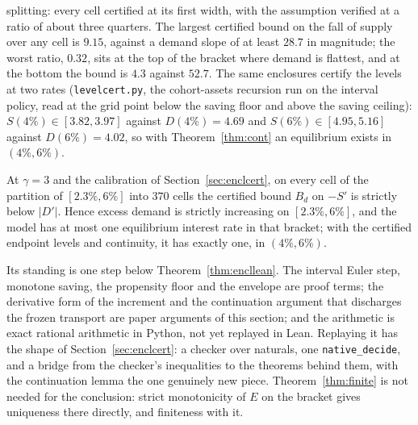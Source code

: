 splitting: every cell certified at its first width, with the assumption verified at a ratio of about
three quarters. The largest certified bound on the fall of supply over any cell is $9.15$, against a
demand slope of at least $28.7$ in magnitude; the worst ratio, $0.32$, sits at the top of the bracket
where demand is flattest, and at the bottom the bound is $4.3$ against $52.7$. The same enclosures
certify the levels at two rates (\texttt{levelcert.py}, the cohort-assets recursion run on the
interval policy, read at the grid point below the saving floor and above the saving ceiling):
$S(4\%)\in[3.82,3.97]$ against $D(4\%)=4.69$ and $S(6\%)\in[4.95,5.16]$ against $D(6\%)=4.02$,
so with Theorem~\ref{thm:cont} an equilibrium exists in $(4\%,6\%)$.

\begin{theorem}\label{thm:bracket}
At $\gamma=3$ and the calibration of Section~\ref{sec:enclcert}, on every cell of the partition of
$[2.3\%,6\%]$ into $370$ cells the certified bound $B_d$ on $-S'$ is strictly below $|D'|$.
Hence excess demand is strictly increasing on $[2.3\%,6\%]$, and the model has at most one
equilibrium interest rate in that bracket; with the certified endpoint levels and continuity, it
has exactly one, in $(4\%,6\%)$.
\end{theorem}

Its standing is one step below Theorem~\ref{thm:encllean}. The interval Euler step, monotone
saving, the propensity floor and the envelope are proof terms; the derivative form of the increment
and the continuation argument that discharges the frozen transport are paper arguments of this
section; and the arithmetic is exact rational arithmetic in Python, not yet replayed in Lean.
Replaying it has the shape of Section~\ref{sec:enclcert}: a checker over naturals, one
\texttt{native\_decide}, and a bridge from the checker's inequalities to the theorems behind them,
with the continuation lemma the one genuinely new piece. Theorem~\ref{thm:finite} is not needed for
the conclusion: strict monotonicity of $E$ on the bracket gives uniqueness there directly, and
finiteness with it.

